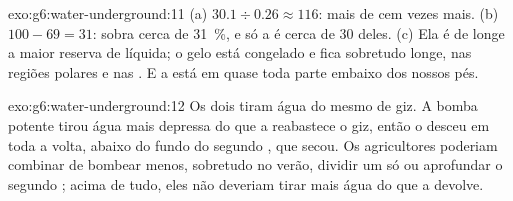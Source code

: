 \begin{solution}{exo:g6:water-underground:11}
(a) $30.1 \div 0.26 \approx 116$: mais de cem vezes mais.
(b) $100 - 69 = 31$: sobra cerca de 31~\%, e só a  é cerca de 30 deles.
(c) Ela é de longe a maior reserva de  líquida; o gelo está
congelado e fica sobretudo longe, nas regiões polares e nas . E a
 está em quase toda parte embaixo dos nossos pés.
\end{solution}

\begin{solution}{exo:g6:water-underground:12}
Os dois  tiram água do mesmo  de giz. A bomba potente tirou
água mais depressa do que a  reabastece o giz, então o 
desceu em toda a volta, abaixo do fundo do segundo , que secou. Os
agricultores poderiam combinar de bombear menos, sobretudo no verão,
dividir um só  ou aprofundar o segundo ; acima de tudo, eles não
deveriam tirar mais água do que a  devolve.
\end{solution}

